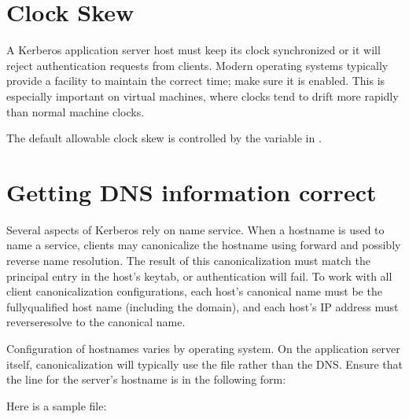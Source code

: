 \documentclass[letterpaper,10pt,english]{sphinxmanual}
\begin{document}
\section{Clock Skew}
\label{\detokenize{admin/appl_servers:clock-skew}}
\sphinxAtStartPar
A Kerberos application server host must keep its clock synchronized or
it will reject authentication requests from clients.  Modern operating
systems typically provide a facility to maintain the correct time;
make sure it is enabled.  This is especially important on virtual
machines, where clocks tend to drift more rapidly than normal machine
clocks.

\sphinxAtStartPar
The default allowable clock skew is controlled by the 
variable in {\hyperref[\detokenize{admin/conf_files/krb5_conf:libdefaults}]{}}.


\section{Getting DNS information correct}
\label{\detokenize{admin/appl_servers:getting-dns-information-correct}}
\sphinxAtStartPar
Several aspects of Kerberos rely on name service.  When a hostname is
used to name a service, clients may canonicalize the hostname using
forward and possibly reverse name resolution.  The result of this
canonicalization must match the principal entry in the host’s keytab,
or authentication will fail.  To work with all client canonicalization
configurations, each host’s canonical name must be the fully\sphinxhyphen{}qualified
host name (including the domain), and each host’s IP address must
reverse\sphinxhyphen{}resolve to the canonical name.

\sphinxAtStartPar
Configuration of hostnames varies by operating system.  On the
application server itself, canonicalization will typically use the
 file rather than the DNS.  Ensure that the line for the
server’s hostname is in the following form:

\begin{sphinxVerbatim}[commandchars=\\\{\}]
                
\end{sphinxVerbatim}

\sphinxAtStartPar
Here is a sample  file:
\end{document}
